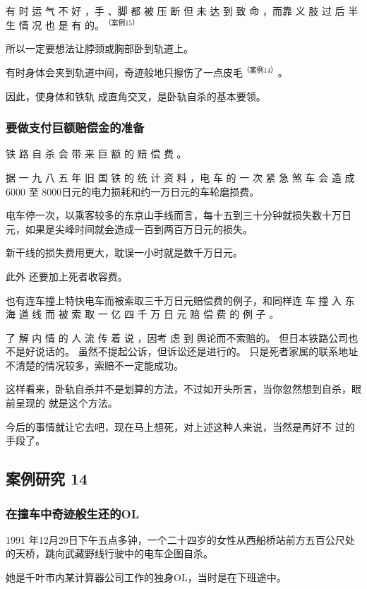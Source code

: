 \documentclass[UTF8]{ctexart}
\begin{document}
有 时 运 气 不 好 ，手 、脚 都 被 压 断 但 未 达 到 致 命 ，而靠 义 肢 过 后 半 生 情 况 也 是 有 的。$^{（案例15）}$

所以一定要想法让脖颈或胸部卧到轨道上。

有时身体会夹到轨道中间，奇迹般地只擦伤了一点皮毛$^{（案例 14）}$。

因此，使身体和铁轨 成直角交叉，是卧轨自杀的基本要领。 

\subsubsection*{要做支付巨额赔偿金的准备}

铁 路 自 杀 会 带 来 巨 额 的 赔 偿 费 。

据 一 九 八 五 年 旧 国 铁 的 统 计 资 料 ，电 车 的 一 次 紧 急 煞 车 会 造 成$6000$ 至 $8000$日元的电力损耗和约一万日元的车轮磨损费。

电车停一次，以乘客较多的东京山手线而言，每十五到三十分钟就损失数十万日元，如果是尖峰时间就会造成一百到两百万日元的损失。

新干线的损失费用更大，耽误一小时就是数千万日元。

此外 还要加上死者收容费。

也有连车撞上特快电车而被索取三千万日元赔偿费的例子，和同样连 车 撞 入 东 海 道 线 而 被 索 取 一 亿 四 千 万 日 元 赔 偿 费 的 例 子 。

了 解 内 情 的 人 流 传 着 说 ，因考 虑 到 舆论而不索赔的。
但日本铁路公司也不是好说话的。
虽然不提起公诉，但诉讼还是进行的。 
只是死者家属的联系地址不清楚的情况较多，索赔不一定能成功。 

这样看来，卧轨自杀并不是划算的方法，不过如开头所言，当你忽然想到自杀，眼前呈现的 就是这个方法。

今后的事情就让它去吧，现在马上想死，对上述这种人来说，当然是再好不 过的手段了。

\subsection{案例研究 14}

\subsubsection*{在撞车中奇迹般生还的OL}

1991 年12月29日下午五点多钟，一个二十四岁的女性从西船桥站前方五百公尺处
的天桥，跳向武藏野线行驶中的电车企图自杀。

她是千叶市内某计算器公司工作的独身OL，当时是在下班途中。
\end{document}
